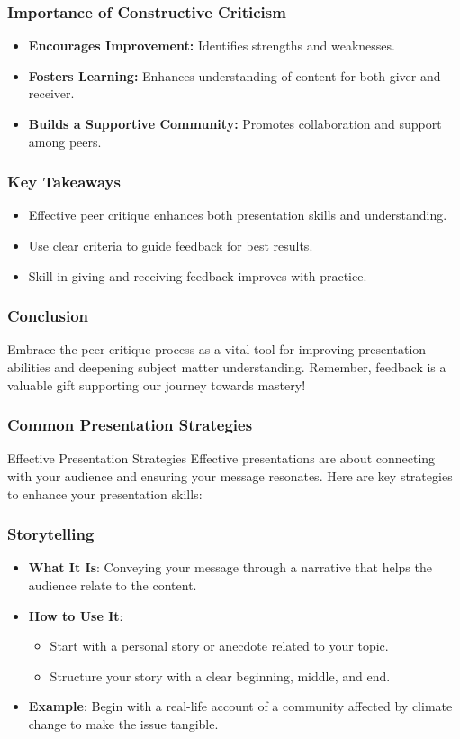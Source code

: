 \documentclass[aspectratio=169]{beamer}
\begin{document}
\begin{frame}[fragile]
  \frametitle{Importance of Constructive Criticism}
  \begin{itemize}
    \item \textbf{Encourages Improvement:} Identifies strengths and weaknesses.
    \item \textbf{Fosters Learning:} Enhances understanding of content for both giver and receiver.
    \item \textbf{Builds a Supportive Community:} Promotes collaboration and support among peers.
  \end{itemize}
\end{frame}

\begin{frame}[fragile]
  \frametitle{Key Takeaways}
  \begin{itemize}
    \item Effective peer critique enhances both presentation skills and understanding.
    \item Use clear criteria to guide feedback for best results.
    \item Skill in giving and receiving feedback improves with practice.
  \end{itemize}
\end{frame}

\begin{frame}[fragile]
  \frametitle{Conclusion}
  Embrace the peer critique process as a vital tool for improving presentation abilities and deepening subject matter understanding. Remember, feedback is a valuable gift supporting our journey towards mastery!
\end{frame}

\begin{frame}[fragile]
    \frametitle{Common Presentation Strategies}
    \begin{block}{Effective Presentation Strategies}
        Effective presentations are about connecting with your audience and ensuring your message resonates. Here are key strategies to enhance your presentation skills:
    \end{block}
\end{frame}

\begin{frame}[fragile]
    \frametitle{Storytelling}
    \begin{itemize}
        \item \textbf{What It Is}: Conveying your message through a narrative that helps the audience relate to the content.
        \item \textbf{How to Use It}:
        \begin{itemize}
            \item Start with a personal story or anecdote related to your topic.
            \item Structure your story with a clear beginning, middle, and end.
        \end{itemize}
        \item \textbf{Example}: Begin with a real-life account of a community affected by climate change to make the issue tangible.
    \end{itemize}
\end{frame}
\end{document}
